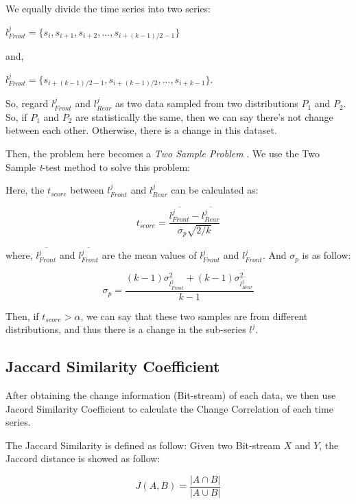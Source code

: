 We equally divide the time series into two series: 

$l^j_{Front} = \{s_i,s_{i+1},s_{i+2},...,s_{i+(k-1)/2 -1}\}$

and, 

$l^j_{Front} = \{s_{i+(k-1)/2 -1},s_{i+(k-1)/2},...,s_{i+k-1}\}$.

So, regard $l^j_{Front}$ and $l^j_{Rear}$ as two data sampled from two distributions $P_1$ and $P_2$. So, if $P_1$ and $P_2$ are statistically the same, then we can say there's not change between each other. Otherwise, there is a change in this dataset.

Then, the problem here becomes a \textit{Two Sample Problem} \cite{gretton2006kernel}. We use the Two Sample \textit{t}-test \cite{moore2007basic} method to solve this problem:

Here, the $t_{score}$ between $l^j_{Front}$ and $l^j_{Rear}$ can be calculated as:

\begin{equation}
t_{score} = \frac{\overline{l^j_{Front}} - \overline{l^j_{Rear}}}{\sigma_p\sqrt{2/k}}
\end{equation}

where, $\overline{l^j_{Front}}$ and $\overline{l^j_{Front}}$ are the mean values of $l^j_{Front}$ and $l^j_{Front}$. And $\sigma_p$ is as follow:

\begin{equation}
\sigma_p = \frac{(k-1)\sigma_{l^j_{Front}}^2 + (k-1)\sigma_{l^j_{Rear}}^2}{k-1}
\end{equation}

Then, if $t_{score} > \alpha$, we can say that these two samples are from different distributions, and thus there is a change in the sub-series $l^j$.

\subsection{Jaccard Similarity Coefficient}

After obtaining the change information (Bit-stream) of each data, we then use Jacord Similarity Coefficient to calculate the Change Correlation of each time series.

The Jaccard Similarity \cite{han2011data} is defined as follow:
Given two Bit-stream $X$ and $Y$, the Jaccord distance is showed as follow:

\begin{equation}
J(A,B) = \frac{|A \cap B|}{|A \cup B|}
\end{equation}

